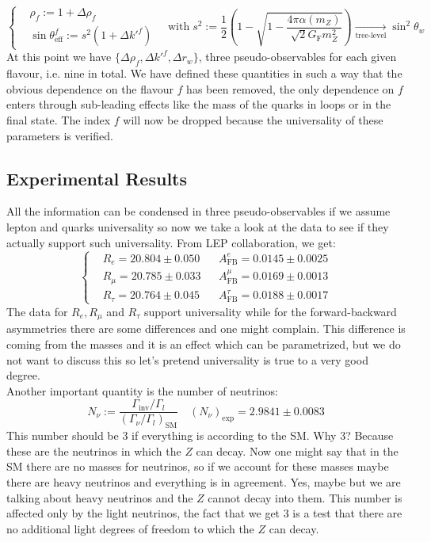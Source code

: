 \documentclass[../main.tex]{subfiles}
\begin{document}
\[
\left\{
\begin{aligned}
&\rho_f:=1+\Delta\rho_f\\
&\sin\theta_{\text{eff}}^f:=s^2(1+\Delta k'^f)
\end{aligned}
\right.
\quad \text{with}\;s^2:=\frac{1}{2}\left(1-\sqrt{1-\frac{4\pi\alpha(m_Z)}{\sqrt{2}G_{\text{F}}m_Z^2}}\right)\xrightarrow[\text{tree-level}]{}\sin^2\theta_w
\]
At this point we have $\{\Delta\rho_f, \Delta k'^f, \Delta r_w\}$, three pseudo-observables for each given flavour, i.e. nine in total. We have defined these quantities in such a way that the obvious dependence on the flavour $f$ has been removed, the only dependence on $f$ enters through sub-leading effects like the mass of the quarks in loops or in the final state. The index $f$ will now be dropped because the universality of these parameters is verified. 
\subsection{Experimental Results}
All the information can be condensed in three pseudo-observables if we assume lepton and quarks universality so now we take a look at the data to see if they actually support such universality. From LEP collaboration, we get:
\[
\left\{
\begin{aligned}
&R_e=20.804\pm0.050 &&A_{\text{FB}}^e=0.0145\pm0.0025\\
&R_\mu=20.785\pm0.033 &&A_{\text{FB}}^\mu=0.0169\pm0.0013\\
&R_\tau=20.764\pm0.045 &&A_{\text{FB}}^\tau=0.0188\pm0.0017
\end{aligned}
\right.
\]
The data for $R_e, R_\mu$ and $R_\tau$ support universality while for the forward-backward asymmetries there are some differences and one might complain. This difference is coming from the masses and it is an effect which can be parametrized, but we do not want to discuss this so let's pretend universality is true to a very good degree.\\
Another important quantity is the number of neutrinos:
\[
N_\nu:=\frac{\Gamma_{\text{inv}}/\Gamma_l}{(\Gamma_\nu/\Gamma_l)_{\text{SM}}} \quad (N_\nu)_{\text{exp}}=2.9841\pm0.0083
\]
This number should be 3 if everything is according to the SM. Why 3? Because these are the neutrinos in which the $Z$ can decay. Now one might say that in the SM there are no masses for neutrinos, so if we account for these masses maybe there are heavy neutrinos and everything is in agreement. Yes, maybe but we are talking about heavy neutrinos and the $Z$ cannot decay into them. This number is affected only by the light neutrinos, the fact that we get 3 is a test that there are no additional light degrees of freedom to which the $Z$ can decay.\\
\end{document}
